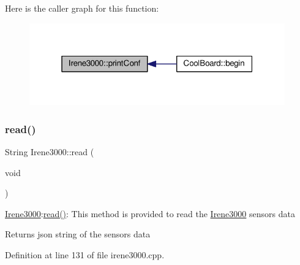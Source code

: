 Here is the caller graph for this function\+:\nopagebreak
\begin{figure}[H]
\begin{center}
\leavevmode
\includegraphics[width=313pt]{d6/d03/class_irene3000_a7bc2414100b5e19eacc6630fa34b2654_icgraph}
\end{center}
\end{figure}
\mbox{\label{class_irene3000_a852a170feea994ea1df01c6b245b5d9a}} 
\subsubsection{\texorpdfstring{read()}{read()}}
{\footnotesize\ttfamily String Irene3000\+::read (\begin{DoxyParamCaption}\item[{void}]{ }\end{DoxyParamCaption})}

\hyperlink{class_irene3000}{Irene3000}\+:\hyperlink{class_irene3000_a852a170feea994ea1df01c6b245b5d9a}{read()}\+: This method is provided to read the \hyperlink{class_irene3000}{Irene3000} sensors data

\begin{DoxyReturn}{Returns}
json string of the sensors data 
\end{DoxyReturn}


Definition at line 131 of file irene3000.\+cpp.


